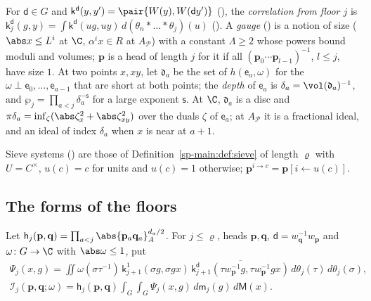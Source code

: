 For $\mathsf d\in G$ and $\mathsf k^{\mathsf d}(y,y')=\pair{W(y),W(\mathsf dy')}$ (), the
\emph{correlation from floor $j$} is $\mathsf k^{\mathsf d}_j(g,y)=\int \mathsf k^{\mathsf d}(ug,uy)\,d(\theta_n*\dots*\theta_j)(u)$
(). A \emph{gauge} () is a notion
of size ($\abs x\le L^i$ at $\C$, $\alpha^ix\in R$ at $A_{\mathcal P}$) with a constant $\Lambda\ge2$ whose powers
bound moduli and volumes; $\mathbf p$ is a head of length $j$ for it if all $(\mathbf p_0\cdots\mathbf p_{l-1})^{-1}$,
$l\le j$, have size $1$. At two points $x,xy$, let $\mathfrak d_a$ be the set of $h(\mathsf e_a,\omega)$ for
the $\omega\perp\mathsf e_0,\dots,\mathsf e_{a-1}$ that are short at both points; the \emph{depth} of $\mathsf e_a$ is
$\delta_a=\vol(\mathfrak d_a)^{-1}$, and $\wp_j=\prod_{a<j}\delta_a^{-\mathsf s}$ for a large exponent
$\mathsf s$. At $\C$, $\mathfrak d_a$ is a disc and
$\pi\delta_a=\inf_\zeta(\abs\zeta_x^2+\abs\zeta_{xy}^2)$ over the duals $\zeta$ of $\mathsf e_a$; at $A_{\mathcal P}$ it is
a fractional ideal, and an ideal of index $\delta_a$ when $x$ is near at $a+1$.

Sieve systems () are those of Definition~\ref{sp-main:def:sieve} of length
$\varrho$ with $U=C^\times$, $u(c)=c$ for units and $u(c)=1$ otherwise; $\mathbf p^{i\to c}=\mathbf p[i\leftarrow u(c)]$.

\subsection{The forms of the floors}\label{sp-frames:ss:forms}

\begin{definition}
Let $\mathsf h_j(\mathbf p,\mathbf q)=\prod_{a<j}\abs{\mathbf p_a\mathbf q_a}_A^{d_a/2}$. For $j\le\varrho$, heads $\mathbf p,\mathbf q$, $\mathsf d=w_{\mathbf q}^{-1}w_{\mathbf p}$
and $\omega\colon G\to\C$ with $\abs\omega\le1$, put
\begin{gather*}
\Psi_j(x,g)=\iint\omega(\sigma\tau^{-1})\,\mathsf k^1_{j+1}(\sigma g,\sigma gx)\,
\overline{\mathsf k^{\mathsf d}_{j+1}(\tau w_{\mathbf p}^{-1}g,\tau w_{\mathbf p}^{-1}gx)}\,d\theta_j(\tau)\,d\theta_j(\sigma),\\
\mathcal I_j(\mathbf p,\mathbf q;\omega)=\mathsf h_j(\mathbf p,\mathbf q)\int_G\int_G\Psi_j(x,g)\,d\mathsf m_j(g)\,d\mathsf M(x).
\end{gather*}
\end{definition}

